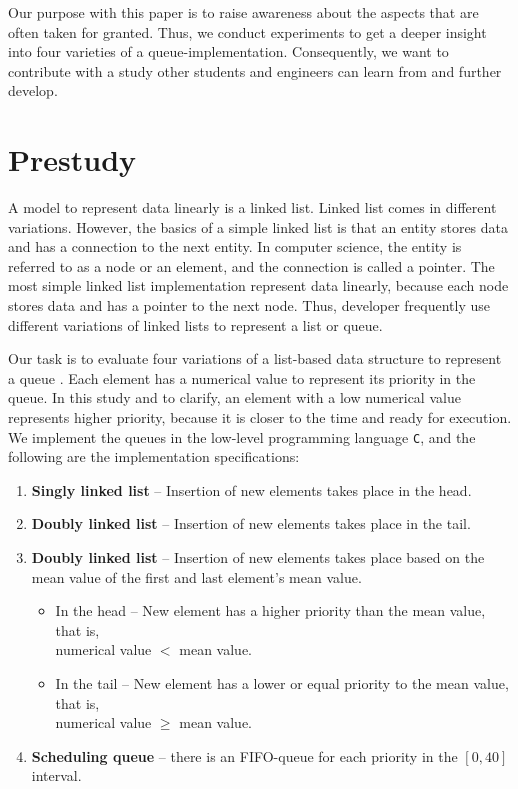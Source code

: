 \documentclass[a4paper,11pt]{kth-mag}
\newcommand*{\skippara}{\par\vspace{\baselineskip} \noindent}
\begin{document}
\skippara Our purpose with this paper is to raise awareness about the aspects that are often taken for granted.
Thus, we conduct experiments to get a deeper insight into four varieties of a queue-implementation.
Consequently, we want to contribute with a study other students and engineers can learn from and further develop.

\section{Prestudy}\label{sec:prestudy}
A model to represent data linearly is a linked list.
Linked list comes in different variations.
However, the basics of a simple linked list is that an entity stores data and has a connection to the next entity.
In computer science, the entity is referred to as a node or an element, and the connection is called a pointer.
The most simple linked list implementation represent data linearly, because each node stores data and has a pointer to the next node.
Thus, developer frequently use different variations of linked lists to represent a list or queue.

\skippara Our task is to evaluate four variations of a list-based data structure to represent a queue \cite{Uppgiftl9:online}.
Each element has a numerical value to represent its priority in the queue.
In this study and to clarify, an element with a low numerical value represents higher priority, because it is closer to the time and ready for execution.
We implement the queues in the low-level programming language \texttt{C}, and the following are the implementation specifications:
\begin{enumerate}
    \item \textbf{Singly linked list} -- Insertion of new elements takes place in the head.
    \item \textbf{Doubly linked list} -- Insertion of new elements takes place in the tail.
        \item \textbf{Doubly linked list} -- Insertion of new elements takes place based on the mean value of the first and last element's mean value.
        \begin{itemize}
            \item In the head -- New element has a higher priority than the mean value, that is, \\numerical value $<$ mean value.
            \item In the tail -- New element has a lower or equal priority to the mean value, that is,\\numerical value $\ge$ mean value.
        \end{itemize}
    \item \textbf{Scheduling queue} -- there is an FIFO-queue for each priority in the $[0,40]$ interval.
\end{enumerate}
\end{document}
